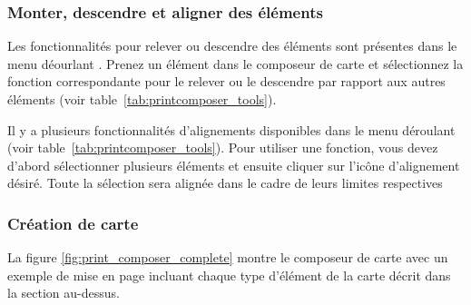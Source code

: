 \subsubsection{Monter, descendre et aligner des éléments}

Les fonctionnalités pour relever ou descendre des éléments sont présentes dans le menu déourlant . Prenez un élément dans le composeur de carte et sélectionnez la fonction correspondante pour le relever ou le descendre par rapport aux autres éléments (voir table~\ref{tab:printcomposer_tools}).

Il y a plusieurs fonctionnalités d'alignements disponibles dans le menu déroulant  (voir table~\ref{tab:printcomposer_tools}). Pour utiliser une fonction, vous devez d'abord sélectionner plusieurs éléments et ensuite cliquer sur l'icône d'alignement désiré. Toute la sélection sera alignée dans le cadre de leurs limites respectives

\subsubsection{Création de carte}

La figure \ref{fig:print_composer_complete} montre le composeur de carte avec
un exemple de mise en page incluant chaque type d'élément de la carte décrit
dans la section au-dessus.

